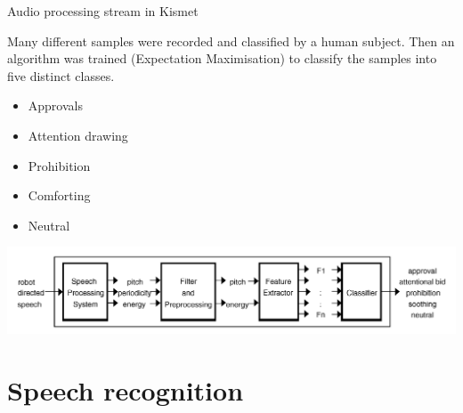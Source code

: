 \documentclass[compress]{beamer}
\begin{document}
\begin{frame}{Audio processing stream in Kismet}

    Many different samples were recorded and classified by a human subject.
    Then an algorithm was trained (Expectation Maximisation) to classify the
    samples into five distinct classes.

    \begin{itemize}
        \item Approvals
        \item Attention drawing
        \item Prohibition
        \item Comforting
        \item Neutral
    \end{itemize}

    \begin{center}
        \includegraphics[width=0.8\linewidth]{kismet-audio-processing}
    \end{center}

\end{frame}



\section{Speech recognition}
\end{document}
